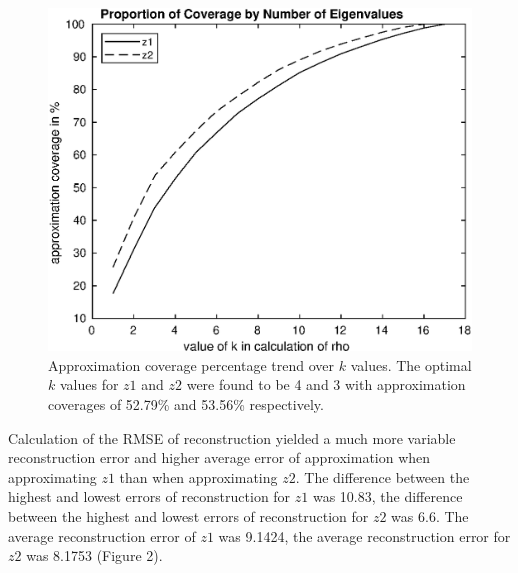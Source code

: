 \documentclass{article}
\begin{document}
	\begin{figure}[H]
    	\centering
    	\includegraphics{figure1}
    	\caption{Approximation coverage percentage trend over $k$ values. The optimal $k$ values for $z1$ and $z2$ were found to be 4 and 3 with approximation coverages of 52.79\% and 53.56\% respectively.}
	\end{figure}
	Calculation of the RMSE of reconstruction yielded a much more variable reconstruction error and higher average error of approximation when approximating $z1$ than when approximating $z2$. The difference between the highest and lowest errors of reconstruction for $z1$ was 10.83, the difference between the highest and lowest errors of reconstruction for $z2$ was 6.6. The average reconstruction error of $z1$ was 9.1424, the average reconstruction error for $z2$ was 8.1753 (Figure 2).
\end{document}
